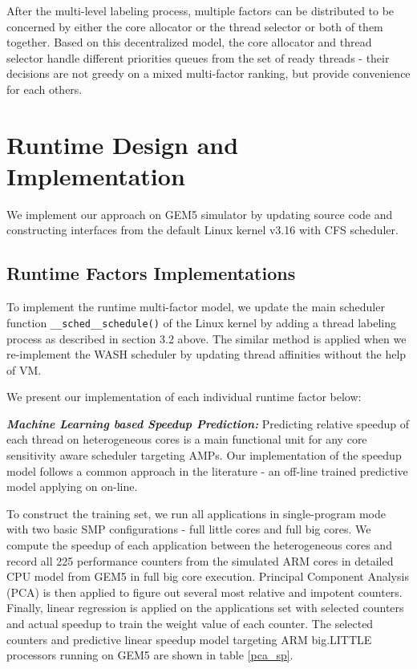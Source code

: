 \documentclass[sigplan,review,anonymous]{acmart}\settopmatter{printfolios=true,printccs=false,printacmref=false}
\begin{document}
After the multi-level labeling process, multiple factors can be distributed to be concerned by either the core allocator or the thread selector or both of them together. Based on this decentralized model, the core allocator and thread selector handle different priorities queues from the set of ready threads - their decisions are not greedy on a mixed multi-factor ranking, but provide convenience for each others. 


\section{Runtime Design and Implementation}
We implement our approach on GEM5 simulator \cite{binkert2011gem5} by updating source code and constructing interfaces from the default Linux kernel v3.16 with CFS scheduler.

\subsection{Runtime Factors Implementations}
To implement the runtime multi-factor model, we update the main scheduler function \texttt{\_\_sched\_\_schedule()} of the Linux kernel by adding a thread labeling process as described in section 3.2 above. The similar method is applied when we re-implement the WASH scheduler by updating thread affinities without the help of VM. 

We present our implementation of each individual runtime factor below:

\textbf{\textit{Machine Learning based Speedup Prediction:}} Predicting relative speedup of each thread on heterogeneous cores is a main functional unit for any core sensitivity aware scheduler targeting AMPs. Our implementation of the speedup model follows a common approach in the literature \cite{van2013fairness,jibaja2016portable,saez2012leveraging}- an off-line trained predictive model applying on on-line. 

To construct the training set, we run all applications in single-program mode with two basic SMP configurations - full little cores and full big cores. We compute the speedup of each application between the heterogeneous cores and record all 225 performance counters from the simulated ARM cores in detailed CPU model from GEM5 \cite{binkert2011gem5} in full big core execution. Principal Component Analysis (PCA) is then applied to figure out several most relative and impotent counters. Finally, linear regression is applied on the applications set with selected counters and actual speedup to train the weight value of each counter. The selected counters and predictive linear speedup model targeting ARM big.LITTLE processors running on GEM5 are shown in table \ref{pca_sp}.  
\end{document}
